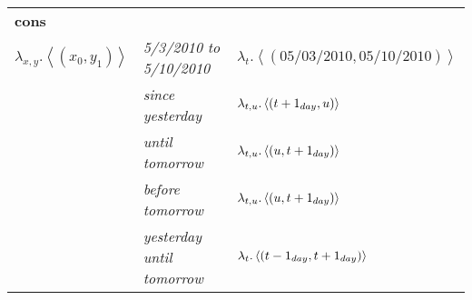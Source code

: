 \documentclass{article}
\begin{document}
\begin{center}
\begin{tabular}{l l l}
	\multicolumn{3}{l}{{\bf cons}} \\
	$\lambda_{x,y}.\left< (x_0, y_1) \right>$
		& {\em 5/3/2010 to 5/10/2010} 
			& $\lambda_{t}.\left< (05/03/2010,05/10/2010) \right>$ \\
		& {\em since yesterday} 
			& $\lambda_{t,u}.\left< (t+1_{day},u) \right>$ \\
		& {\em until tomorrow} 
			& $\lambda_{t,u}.\left< (u,t+1_{day}) \right>$ \\
		& {\em before tomorrow} 
			& $\lambda_{t,u}.\left< (u,t+1_{day}) \right>$ \\
		& {\em yesterday until tomorrow} 
			& $\lambda_{t}.\left< (t-1_{day},t+1_{day}) \right>$ \\
\end{tabular}
\end{center}

\end{document}
